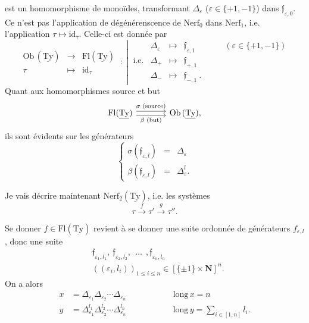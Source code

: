 \documentclass[11pt]{article}
\newcommand{\msp}[1]{\marginpar{\footnotesize [#1]}}
\newcommand{\uTy}{\underline{\mathrm{Ty}}}
\begin{document}
est un homomorphisme de monoïdes, transformant $\Delta_\varepsilon$ ($\varepsilon\in\{+1,-1\}$) dans $\mathfrak{f}_{\varepsilon,0}$. Ce n'est pas l'application de dégénérenscence de $\mathrm{Nerf}_0$ dans $\mathrm{Nerf}_1$, i.e. l'application $\tau\longmapsto\mathrm{id}_\tau$. Celle-ci est donnée par %
\[
\begin{array}{ccc}
\mathrm{Ob}\,(\uTy) & \longrightarrow & \mathrm{Fl}(\uTy)\\[4pt]
\tau & \longmapsto & \mathrm{id}_\tau
\end{array}
\ :\
\left|\
\begin{array}{rcccl}
 & \Delta_\varepsilon & \longmapsto & \mathfrak{f}_{\varepsilon,1} & \qquad(\varepsilon\in\{+1,-1\})\\[4pt]
\text{i.e.} & \Delta_+ & \longmapsto & \mathfrak{f}_{+,1} & \\[4pt]
 & \Delta_- & \longmapsto & \mathfrak{f}_{-,1}\ . &
\end{array}
\right.
\]
Quant aux homomorphismes source et but
\[
\begin{tikzcd}[column sep=large]
\mathrm{Fl}(\uTy) \arrow[r, shift left, "\sigma\text{ (source)}"] \arrow[r, shift right, "\beta\text{ (but)}"'] & \mathrm{Ob}\,(\uTy),
\end{tikzcd}
\]
ils sont évidents sur les générateurs
\[
\left\{
\begin{array}{lcl}
\sigma(\mathfrak{f}_{\varepsilon,l}) & = & \Delta_\varepsilon\\[4pt]
\beta(\mathfrak{f}_{\varepsilon,l}) & = & \Delta^l_\varepsilon.
\end{array}
\right.
\]

Je vais décrire maintenant $\mathrm{Nerf}_2(\uTy)$, i.e. les systèmes
\[
\tau \xrightarrow{\ f\ } \tau' \xrightarrow{\ g\ } \tau''.
\]

\msp{page 52}
Se donner $f\in\mathrm{Fl}(\uTy)$ revient à se donner une suite ordonnée de générateurs $f_{\varepsilon,l}$, donc une suite
\[
\begin{aligned}
&\mathfrak{f}_{\varepsilon_1,l_1},\ \mathfrak{f}_{\varepsilon_2,l_2},\ \ \dots\ \ ,\mathfrak{f}_{\varepsilon_n,l_n}\\
&((\varepsilon_i,l_i))_{1\leq i\leq n}\in[\{\pm1\}\times\mathbf{N}]^n.
\end{aligned}
\]
On a alors
\[
\begin{aligned}
x &= \Delta_{\varepsilon_1}\Delta_{\varepsilon_2}\cdots\Delta_{\varepsilon_n} &\qquad\qquad& \mathrm{long}\,x = n\\
y &= \Delta^{l_1}_{\varepsilon_1}\Delta^{l_2}_{\varepsilon_2}\cdots\Delta^{l_n}_{\varepsilon_n} && \mathrm{long}\,y = \textstyle\sum_{i\in[1,n]} l_i.
\end{aligned}
\]
\end{document}
